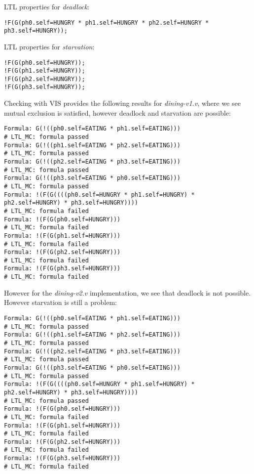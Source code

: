 \documentclass[a4paper]{article}
\begin{document}
LTL properties for {\em deadlock}:

\begin{lstlisting}
!F(G(ph0.self=HUNGRY * ph1.self=HUNGRY * ph2.self=HUNGRY * ph3.self=HUNGRY));
\end{lstlisting}

LTL properties for {\em starvation}:

\begin{lstlisting}
!F(G(ph0.self=HUNGRY));
!F(G(ph1.self=HUNGRY));
!F(G(ph2.self=HUNGRY));
!F(G(ph3.self=HUNGRY));
\end{lstlisting}

Checking with VIS provides the following results for {\em dining-v1.v},
where we see mutual exclusion is satisfied, however deadlock and starvation are
possible:

\begin{lstlisting}
Formula: G(!((ph0.self=EATING * ph1.self=EATING)))
# LTL_MC: formula passed
Formula: G(!((ph1.self=EATING * ph2.self=EATING)))
# LTL_MC: formula passed
Formula: G(!((ph2.self=EATING * ph3.self=EATING)))
# LTL_MC: formula passed
Formula: G(!((ph3.self=EATING * ph0.self=EATING)))
# LTL_MC: formula passed
Formula: !(F(G((((ph0.self=HUNGRY * ph1.self=HUNGRY) * ph2.self=HUNGRY) * ph3.self=HUNGRY))))
# LTL_MC: formula failed
Formula: !(F(G(ph0.self=HUNGRY)))
# LTL_MC: formula failed
Formula: !(F(G(ph1.self=HUNGRY)))
# LTL_MC: formula failed
Formula: !(F(G(ph2.self=HUNGRY)))
# LTL_MC: formula failed
Formula: !(F(G(ph3.self=HUNGRY)))
# LTL_MC: formula failed
\end{lstlisting}

However for the {\em dining-v2.v} implementation, we see that deadlock is not
possible. However starvation is still a problem:

\begin{lstlisting}
Formula: G(!((ph0.self=EATING * ph1.self=EATING)))
# LTL_MC: formula passed
Formula: G(!((ph1.self=EATING * ph2.self=EATING)))
# LTL_MC: formula passed
Formula: G(!((ph2.self=EATING * ph3.self=EATING)))
# LTL_MC: formula passed
Formula: G(!((ph3.self=EATING * ph0.self=EATING)))
# LTL_MC: formula passed
Formula: !(F(G((((ph0.self=HUNGRY * ph1.self=HUNGRY) * ph2.self=HUNGRY) * ph3.self=HUNGRY))))
# LTL_MC: formula passed
Formula: !(F(G(ph0.self=HUNGRY)))
# LTL_MC: formula failed
Formula: !(F(G(ph1.self=HUNGRY)))
# LTL_MC: formula failed
Formula: !(F(G(ph2.self=HUNGRY)))
# LTL_MC: formula failed
Formula: !(F(G(ph3.self=HUNGRY)))
# LTL_MC: formula failed
\end{lstlisting}
\end{document}
